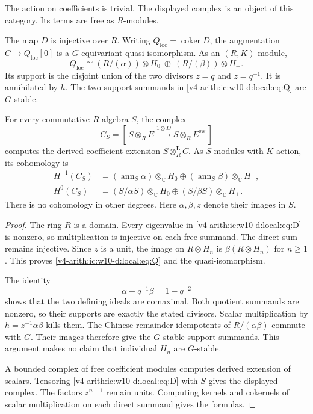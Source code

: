 The action on coefficients is trivial.
The displayed complex is an object of this category.
Its terms are free as $R$-modules.

\begin{theorem}\label{v4-arith:ic:w10-d:local:thm:cone}
The map $D$ is injective over $R$.
Writing $Q_{\mathrm{loc}}=\operatorname{coker} D$, the augmentation $C\to Q_{\mathrm{loc}}[0]$ is a $G$-equivariant quasi-isomorphism.
As an $(R,K)$-module,
\begin{equation}\label{v4-arith:ic:w10-d:local:eq:Q}
 Q_{\mathrm{loc}}\cong (R/(\alpha))\otimes H_0
       \ \oplus\ (R/(\beta))\otimes H_+.
\end{equation}
Its support is the disjoint union of the two divisors $z=q$ and $z=q^{-1}$.
It is annihilated by $h$.
The two support summands in \eqref{v4-arith:ic:w10-d:local:eq:Q} are $G$-stable.

For every commutative $R$-algebra $S$, the complex
\[
 C_S=[\,S\otimes_R E\xrightarrow{1\otimes D}S\otimes_R E^\mathrm{sw}\,]
\]
computes the derived coefficient extension $S\otimes_R^{\mathbf L}C$.
As $S$-modules with $K$-action, its cohomology is
\begin{align*}
 H^{-1}(C_S)&=(\operatorname{ann}_S\alpha)\otimes_\mathbb C H_0
              \oplus(\operatorname{ann}_S\beta)\otimes_\mathbb C H_+,\\
 H^0(C_S)&=(S/\alpha S)\otimes_\mathbb C H_0
              \oplus(S/\beta S)\otimes_\mathbb C H_+.
\end{align*}
There is no cohomology in other degrees.
Here $\alpha,\beta,z$ denote their images in $S$.
\end{theorem}
\begin{proof}
The ring $R$ is a domain.
Every eigenvalue in \eqref{v4-arith:ic:w10-d:local:eq:D} is nonzero, so multiplication is injective on each free summand.
The direct sum remains injective.
Since $z$ is a unit, the image on $R\otimes H_n$ is
$\beta(R\otimes H_n)$ for $n\ge1$.
This proves \eqref{v4-arith:ic:w10-d:local:eq:Q} and the quasi-isomorphism.

The identity
\begin{equation}\label{v4-arith:ic:w10-d:local:eq:bezout}
 \alpha+q^{-1}\beta=1-q^{-2}
\end{equation}
shows that the two defining ideals are comaximal.
Both quotient summands are nonzero, so their supports are exactly the stated divisors.
Scalar multiplication by $h=z^{-1}\alpha\beta$ kills them.
The Chinese remainder idempotents of $R/(\alpha\beta)$ commute with $G$.
Their images therefore give the $G$-stable support summands.
This argument makes no claim that individual $H_n$ are $G$-stable.

A bounded complex of free coefficient modules computes derived extension of scalars.
Tensoring \eqref{v4-arith:ic:w10-d:local:eq:D} with $S$ gives the displayed complex.
The factors $z^{n-1}$ remain units.
Computing kernels and cokernels of scalar multiplication on each direct summand gives the formulas.
\end{proof}

